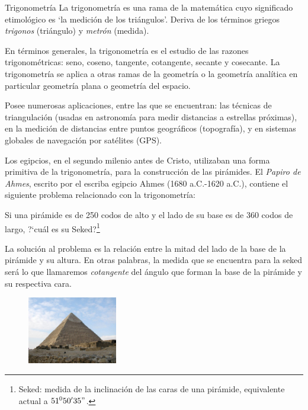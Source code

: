 \begin{myexampleblock}{Trigonometría}
\vspace{2mm} La trigonometría es una rama de la matemática cuyo significado etimológico es `la medición de los triángulos'. 
Deriva de los términos griegos \emph{trigonos} (triángulo) y \emph{metrón} (medida).


\vspace{2mm} En términos generales, la trigonometría es el estudio de las razones trigonométricas: seno, coseno, tangente, cotangente, secante y cosecante. La trigonometría se aplica a otras ramas de la geometría o la geometría analítica en particular geometría plana o geometría del espacio.

\vspace{2mm} Posee numerosas aplicaciones, entre las que se encuentran: las técnicas de triangulación (usadas en astronomía para medir distancias a estrellas próximas), en la medición de distancias entre puntos geográficos (topografía), y en sistemas globales de navegación por satélites (GPS).	



\vspace{2mm} Los egipcios, en el segundo milenio antes de Cristo, utilizaban una forma primitiva de la trigonometría, para la construcción de las pirámides. El \emph{Papiro de Ahmes}, escrito por el escriba egipcio Ahmes (1680 a.C.-1620 a.C.), contiene el siguiente problema relacionado con la trigonometría:

\vspace{2mm}Si una pirámide es de 250 codos de alto y el lado de su base es de 360 codos de largo, ?`cuál es su Seked?\footnote{ Seked: medida de la inclinación de las caras de una pirámide, equivalente actual a  $51^0 50' 35"$. }

\begin{multicols}{2}
\vspace{2mm}La solución al problema es la relación entre la mitad del lado de la base de la pirámide y su altura. En otras palabras, la medida que se encuentra para la seked será lo que llamaremos  \emph{cotangente} del ángulo que forman la base de la pirámide y su respectiva cara.
\begin{figure}[H]
	\centering
	\includegraphics[width=0.35\textwidth]{img-rt/rt01.jpg}
\end{figure}
\end{multicols}
\end{myexampleblock}



